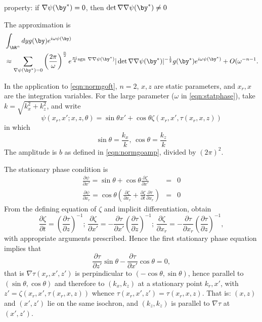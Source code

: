  property: if $\nabla \psi(\by^*) = 0$, then $\det \nabla \nabla \psi(\by^*) \ne 0$

The approximation is
\begin{equation}
\label{eqn:statphase}
\begin{aligned} 
&\int_{\bR^n}dy g(\by)e^{i\omega \psi(\by)}\\
&\approx \sum_{\nabla
  \psi(\by^*)=0}\left(\frac{2\pi}{\omega}\right)^{\frac{n}{2}}e^{\frac{\pi
    i}{4}\mathrm{sgn}\  \nabla\nabla\psi(\by^*)}
|\det \nabla \nabla \psi(\by^*)|^{-\frac{1}{2}}g(\by^*)e^{i\omega \psi(\by^*)} + O(\omega^{-n-1}.
\end{aligned}
\end{equation}

In the application to \ref{eqn:normgoft}, $n=2$, $x,z$ are static parameters, and $x_r,x$ are the integration variables. For the large parameter ($\omega$ in \ref{eqn:statphase}), take $k=\sqrt{k_x^2+k_z^2}$, and write  
\begin{equation}
\label{eqn:normgophase}
\psi(x_r,x';x,z,\theta) = \sin \theta x' + \cos \theta \zeta(x_r,x',\tau(x_r,x,z))
\end{equation}
in which 
\[
\sin \theta = \frac{k_x}{k},\,\cos\theta=\frac{k_z}{k}
\]
The amplitude is $b$ as defined in \ref{eqn:normgoamp}, divided by $(2\pi)^2$.

The stationary phase condition is
\begin{eqnarray}
\label{eqn:normgostat}
\frac{\partial \psi}{\partial x'} = \sin \theta + \cos \theta \frac{\partial \zeta}{\partial x'} & = & 0\nonumber \\
\frac{\partial \psi}{\partial x_r} = \cos \theta\left(\frac{\partial \zeta}{\partial x_r} + \frac{\partial \zeta}{\partial t}\frac{\partial \tau}{\partial x_r}\right)& =& 0
\end{eqnarray}
From the defining equation of $\zeta$ and implicit differentiation, obtain
\[
\frac{\partial \zeta}{\partial t} = \left(\frac{\partial \tau}{\partial z}\right)^{-1}; \,
\frac{\partial \zeta}{\partial x'} = -\frac{\partial \tau}{\partial x'}\left(\frac{\partial \tau}{\partial z}\right)^{-1}; \,\frac{\partial \zeta}{\partial x_r} = -\frac{\partial \tau}{\partial x_r}\left(\frac{\partial \tau}{\partial z}\right)^{-1},
\]
with appropriate arguments prescribed. Hence the first stationary phase equation implies that
\[
\frac{\partial \tau}{\partial z'} \sin \theta - \frac{\partial \tau}{\partial x'}\cos \theta = 0,
\]
that is $\nabla \tau(x_r,x',z')$ is perpindicular to $(-\cos \theta, \sin \theta)$, hence parallel to 
$(\sin \theta, \cos \theta)$ and therefore to $(k_x,k_z)$ at a stationary point $k_r,x'$, with $z'=\zeta(x_r,x',\tau(x_r,x,z))$ whence $\tau(x_r,x',z') = \tau(x_r,x,z)$. That is: $(x,z)$ and $(x',z')$ lie on the same isochron, and $(k_z,k_z)$ is parallel to $\nabla \tau$ at $(x',z')$.


